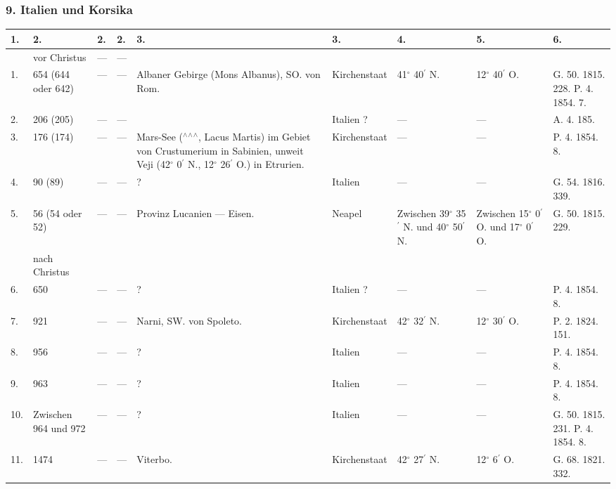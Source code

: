 \documentclass[a4paper, 8pt, oneside, polutonikogreek, german]{article}
\begin{document}
\subsubsection{9. Italien und Korsika}
\begin{center}
    \footnotesize
    \begin{longtable}{|p{3mm}|p{10mm}|p{5mm}|p{13mm}|p{25mm}|p{15mm}|p{10mm}|p{10mm}|p{11mm}|}
    \hline
        1. & 2. & 2. & 2. & 3. & 3. & 4. & 5. & 6. \\ \hline
          & vor Christus & --- & --- &   &   &   &   &   \\ \hline
        1. & 654 (644 oder 642) & --- & --- & Albaner Gebirge (Mons Albanus), SO. von Rom. & Kirchenstaat & 41$^\circ$ 40$^\prime$ N. & 12$^\circ$ 40$^\prime$ O. & G. 50. 1815. 228. P. 4. 1854. 7. \\ \hline
        2. & 206 (205) & --- & --- & ~ & Italien ? & --- & --- & A. 4. 185. \\ \hline
        3. & 176 (174) & --- & --- & Mars-See ($^\wedge$$^\wedge$$^\wedge$, Lacus Martis) im Gebiet von Crustumerium in Sabinien, unweit Veji (42$^\circ$ 0$^\prime$ N., 12$^\circ$ 26$^\prime$ O.) in Etrurien. & Kirchenstaat & --- & --- & P. 4. 1854. 8. \\ \hline
        4. & 90 (89) & --- & --- & ? & Italien & --- & --- & G. 54. 1816. 339. \\ \hline
        5. & 56 (54 oder 52) & --- & --- & Provinz Lucanien --- Eisen. & Neapel & Zwischen 39$^\circ$ 35$^\prime$ N. und 40$^\circ$ 50$^\prime$ N. & Zwischen 15$^\circ$ 0$^\prime$ O. und 17$^\circ$ 0$^\prime$ O. & G. 50. 1815. 229. \\ \hline
          & nach Christus &   &   &   &   &   &   &   \\ \hline
        6. & 650 & --- & --- & ? & Italien ? & --- & --- & P. 4. 1854. 8. \\ \hline
        7. & 921 & --- & --- & Narni, SW. von Spoleto. & Kirchenstaat & 42$^\circ$ 32$^\prime$ N. & 12$^\circ$ 30$^\prime$ O. & P. 2. 1824. 151. \\ \hline
        8. & 956 & --- & --- & ? & Italien & --- & --- & P. 4. 1854. 8. \\ \hline
        9. & 963 & --- & --- & ? & Italien & --- & --- & P. 4. 1854. 8. \\ \hline
        10. & Zwischen 964 und 972 & --- & --- & ? & Italien & --- & --- & G. 50. 1815. 231. P. 4. 1854. 8. \\ \hline
        11. & 1474 & --- & --- & Viterbo. & Kirchenstaat & 42$^\circ$ 27$^\prime$ N. & 12$^\circ$ 6$^\prime$ O. & G. 68. 1821. 332. \\ \hline

\end{longtable}
\end{center}
\end{document}
